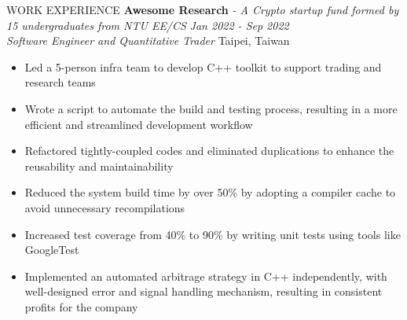 \documentclass{resume} %
\begin{document}

\begin{rSection}{WORK EXPERIENCE} 
\textbf{Awesome Research} \textit{- A Crypto startup fund formed by 15 undergraduates from NTU EE/CS} \hfill \textit{Jan 2022 - Sep 2022} \\  
\textit{Software Engineer and Quantitative Trader}  \hfill {Taipei, Taiwan} 
    \begin{itemize}
        \item Led a 5-person infra team to develop C++ toolkit to support trading and research teams 
        \item Wrote a script to automate the build and testing process, resulting in a more efficient and streamlined development workflow
        \item Refactored tightly-coupled codes and eliminated duplications to enhance the reusability and maintainability
        \item Reduced the system build time by over 50\% by adopting a compiler cache to avoid unnecessary recompilations
        \item Increased test coverage from 40\% to 90\% by writing unit tests using tools like GoogleTest
        \item Implemented an automated arbitrage strategy in C++ independently, with well-designed error and signal handling mechanism, resulting in consistent profits for the company 
    \end{itemize}




    
\end{rSection} 
\end{document}
